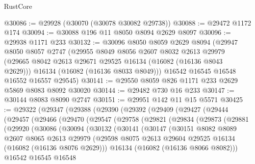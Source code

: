 \begin{lexlean}{RustCore}
\begin{coremodule}
@30086 := @29928 (@30070 (@30078 @30082 @29738))
@30088 := @29472 @1172 @174
@30094 := @30088 @196 @11 @8050 @8094 @2629 @8097
@30096 := @29938 @1171 @233
@30132 := @30096
    @8050
    @8059
    @2629
    @8094
    (@29947
      @8050
      @8057
      @2747
      (@29955
        @8049
        @8056
        @2607
        @8032
        @2613
        @29979
        (@29665 @8042 @2613 @29671 @29525 @16134 (@16082 (@16136 @8043 @2629)))
        @16134
        (@16082 (@16136 @8033 @8049)))
      @16542
      @16545
      @16548
      @16552
      @16557
      @29545)
@30141 := @29550 @8059 @826 @1171 @233 @2629 @5869 @8083 @8092 @30020
@30144 := @29482 @730 @16 @233
@30147 := @30144 @8083 @8090 @2747
@30151 := @29951 @142 @11 @15 @5571
@30425 := @29322
    (@29347
      (@29388
        (@29390
          (@29392
            (@29409
              (@29427
                (@29444
                  (@29457
                    (@29466
                      (@29470
                        (@29547
                          (@29758
                            (@29821
                              (@29834
                                (@29873
                                  (@29881
                                    (@29920
                                      (@30086
                                        (@30094
                                          (@30132
                                            (@30141
                                              (@30147
                                                (@30151
                                                  @8082
                                                  @8089
                                                  @2607
                                                  @8065
                                                  @2613
                                                  @29979
                                                  (@29598
                                                    @8075
                                                    @2613
                                                    @29604
                                                    @29525
                                                    @16134
                                                    (@16082 (@16136 @8076 @2629)))
                                                  @16134
                                                  (@16082 (@16136 @8066 @8082)))
                                                @16542
                                                @16545
                                                @16548

\end{coremodule}
\end{lexlean}
